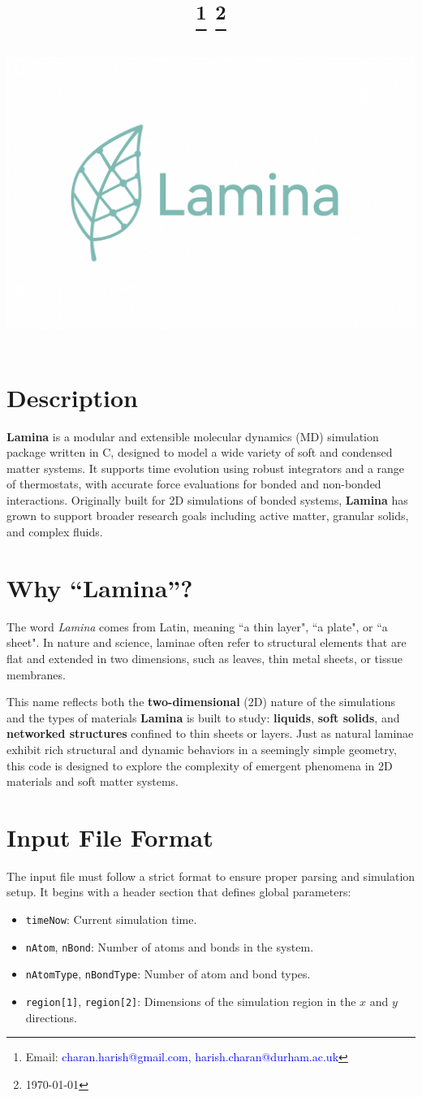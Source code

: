 \documentclass[a4paper,10pt]{article}
\title{\vspace{-1.0cm}{\large{\textbf{\textcolor{Mahogany}{Lamina} - A 2D Molecular Dynamics Simulator}\\
\textbf{Harish Charan, {\sf Durham University, Durham, UK}}}}%
\thanks{\textsf{Email: \textcolor{Blue}{charan.harish@gmail.com, harish.charan@durham.ac.uk}}}
\thanks{\textsf{\textcolor{Mahogany}{\today}}}%
\begin{center}
\vspace*{2cm}
\includegraphics[width=\textwidth]{../figures/LogoLaminaLatex.png} \\[1cm]
\end{center}
}
\date{} %
\begin{document}
\maketitle

\section*{Description}

\textbf{Lamina} is a modular and extensible molecular dynamics (MD) simulation package written in C, designed to model 
a wide variety of soft and condensed matter systems. It supports time evolution using robust integrators and a range of 
thermostats, with accurate force evaluations for bonded and non-bonded interactions. Originally built for 2D simulations 
of bonded systems, \textbf{Lamina} has grown to support broader research goals including active matter, granular solids, 
and complex fluids.

\section*{Why ``Lamina''?}

The word \textit{Lamina} comes from Latin, meaning ``a thin layer", ``a plate", or ``a sheet". In nature and science, 
laminae often refer to structural elements that are flat and extended in two dimensions, such as leaves, thin metal 
sheets, or tissue membranes.

This name reflects both the \textbf{two-dimensional} (2D) nature of the simulations and the types of materials 
\textbf{Lamina} is built to study: \textbf{liquids}, \textbf{soft solids}, and \textbf{networked structures} confined to 
thin sheets or layers. Just as natural laminae exhibit rich structural and dynamic behaviors in a seemingly simple 
geometry, this code is designed to explore the complexity of emergent phenomena in 2D materials and soft matter systems.

\section*{Input File Format}

The input file must follow a strict format to ensure proper parsing and simulation setup. It begins with a header section 
that defines global parameters:

\begin{itemize}
  \item \texttt{timeNow}: Current simulation time.
  \item \texttt{nAtom}, \texttt{nBond}: Number of atoms and bonds in the system.
  \item \texttt{nAtomType}, \texttt{nBondType}: Number of atom and bond types.
  \item \texttt{region[1]}, \texttt{region[2]}: Dimensions of the simulation region in the \(x\) and \(y\) directions.
\end{itemize}
\end{document}

